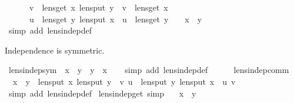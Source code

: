 \begin{isabellebody}
\ \ \ \ \ {\isasymAnd}\ v\ {\isasymsigma}{\isachardot}\ lens{\isacharunderscore}get\ x\ {\isacharparenleft}lens{\isacharunderscore}put\ y\ {\isasymsigma}\ v{\isacharparenright}\ {\isacharequal}\ lens{\isacharunderscore}get\ x\ {\isasymsigma}{\isacharsemicolon}\isanewline
\ \ \ \ \ {\isasymAnd}\ u\ {\isasymsigma}{\isachardot}\ lens{\isacharunderscore}get\ y\ {\isacharparenleft}lens{\isacharunderscore}put\ x\ {\isasymsigma}\ u{\isacharparenright}\ {\isacharequal}\ lens{\isacharunderscore}get\ y\ {\isasymsigma}\ {\isasymrbrakk}\ {\isasymLongrightarrow}\ x\ {\isasymbowtie}\ y{\isachardoublequoteclose}\isanewline
%
\isadelimproof
\ \ %
\endisadelimproof
%
\isatagproof
{}\isamarkupfalse%
\ {\isacharparenleft}simp\ add{\isacharcolon}\ lens{\isacharunderscore}indep{\isacharunderscore}def{\isacharparenright}%
\endisatagproof
{\isafoldproof}%
%
\isadelimproof
%
\endisadelimproof
%
\begin{isamarkuptext}%
Independence is symmetric.%
\end{isamarkuptext}\isamarkuptrue%
\isamarkupfalse%
\ lens{\isacharunderscore}indep{\isacharunderscore}sym{\isacharcolon}\ \ {\isachardoublequoteopen}x\ {\isasymbowtie}\ y\ {\isasymLongrightarrow}\ y\ {\isasymbowtie}\ x{\isachardoublequoteclose}\isanewline
%
\isadelimproof
\ \ %
\endisadelimproof
%
\isatagproof
{}\isamarkupfalse%
\ {\isacharparenleft}simp\ add{\isacharcolon}\ lens{\isacharunderscore}indep{\isacharunderscore}def{\isacharparenright}%
\endisatagproof
{\isafoldproof}%
%
\isadelimproof
\isanewline
%
\endisadelimproof
\ \ \ \ \isanewline
{}\isamarkupfalse%
\ lens{\isacharunderscore}indep{\isacharunderscore}comm{\isacharcolon}\isanewline
\ \ {\isachardoublequoteopen}x\ {\isasymbowtie}\ y\ {\isasymLongrightarrow}\ lens{\isacharunderscore}put\ x\ {\isacharparenleft}lens{\isacharunderscore}put\ y\ {\isasymsigma}\ v{\isacharparenright}\ u\ {\isacharequal}\ lens{\isacharunderscore}put\ y\ {\isacharparenleft}lens{\isacharunderscore}put\ x\ {\isasymsigma}\ u{\isacharparenright}\ v{\isachardoublequoteclose}\isanewline
%
\isadelimproof
\ \ %
\endisadelimproof
%
\isatagproof
{}\isamarkupfalse%
\ {\isacharparenleft}simp\ add{\isacharcolon}\ lens{\isacharunderscore}indep{\isacharunderscore}def{\isacharparenright}%
\endisatagproof
{\isafoldproof}%
%
\isadelimproof
\isanewline
%
\endisadelimproof
\isanewline
{}\isamarkupfalse%
\ lens{\isacharunderscore}indep{\isacharunderscore}get\ {\isacharbrackleft}simp{\isacharbrackright}{\isacharcolon}\isanewline
\ \ \ {\isachardoublequoteopen}x\ {\isasymbowtie}\ y{\isachardoublequoteclose}\isanewline

\end{isabellebody}
